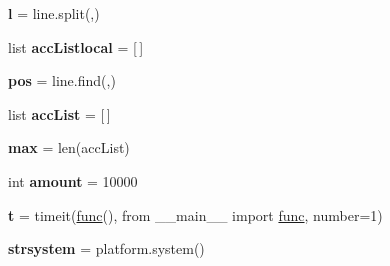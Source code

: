 \begin{DoxyCompactItemize}
{\bfseries l} = line.\+split(\textquotesingle{},\textquotesingle{})
\item 
\mbox{\label{structtest_a9ac56defb33b25d2fd55563540e48371}} 
list {\bfseries acc\+Listlocal} = \mbox{[}$\,$\mbox{]}
\item 
\mbox{\label{structtest_a771322bd5e852d984bd50d64a13a09e2}} 
{\bfseries pos} = line.\+find(\textquotesingle{},\textquotesingle{})
\item 
\mbox{\label{structtest_a1dd3c772a190dfd68d58e06c4104d879}} 
list {\bfseries acc\+List} = \mbox{[}$\,$\mbox{]}
\item 
\mbox{\label{structtest_a08f744028867c9323f8a54f6894d84d7}} 
{\bfseries max} = len(acc\+List)
\item 
\mbox{\label{structtest_ad1c6e55f39c29d0da5a0bb3869deeacd}} 
int {\bfseries amount} = 10000
\item 
\mbox{\label{structtest_ac69c8db6c01f30c3cbee6afb96727b94}} 
{\bfseries t} = timeit(\textquotesingle{}\mbox{\hyperlink{structfunc}{func}}()\textquotesingle{}, \textquotesingle{}from \+\_\+\+\_\+main\+\_\+\+\_\+ import \mbox{\hyperlink{structfunc}{func}}\textquotesingle{}, number=1)
\item 
\mbox{\label{structtest_a7cd776ec64b082f5c0dc70f860981034}} 
{\bfseries strsystem} = platform.\+system()
\end{DoxyCompactItemize}
